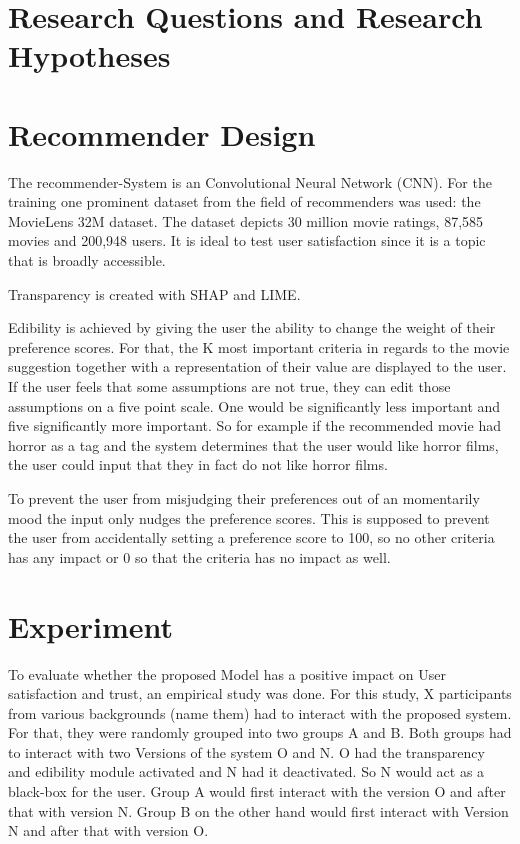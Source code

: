 \documentclass[sigconf]{acmart}
\begin{document}
\section{Research Questions and Research Hypotheses}

\section{Recommender Design}
The recommender-System is an Convolutional Neural Network (CNN). For the training one prominent dataset from the field of recommenders was used: the MovieLens 32M dataset. The dataset depicts 30 million movie ratings, 87,585 movies and 200,948 users. It is ideal to test user satisfaction since it is a topic that is broadly accessible.

Transparency is created with SHAP and LIME.  

Edibility is achieved by giving the user the ability to change the weight of their preference scores. For that, the K most important criteria in regards to the movie suggestion together with a representation of their value are displayed to the user. If the user feels that some assumptions are not true, they can edit those assumptions on a five point scale. One would be significantly less important and five significantly more important. So for example if the recommended movie had horror as a tag and the system determines that the user would like horror films, the user could input that they in fact do not like horror films. 

To prevent the user from misjudging their preferences out of an momentarily mood the input only nudges the preference scores. This is supposed to prevent the user from accidentally setting a preference score to 100, so no other criteria has any impact or 0 so that the criteria has no impact as well. 

\section{Experiment}
To evaluate whether the proposed Model has a positive impact on User satisfaction and trust, an empirical study was done. For this study, X participants from various backgrounds (name them) had to interact with the proposed system. For that, they were randomly grouped into two groups A and B. Both groups had to interact with two Versions of the system O and N. O had the transparency and edibility module activated and N had it deactivated. So N would act as a black-box for the user. Group A would first interact with the version O and after that with version N. Group B on the other hand would first interact with Version N and after that with version O.
\end{document}
